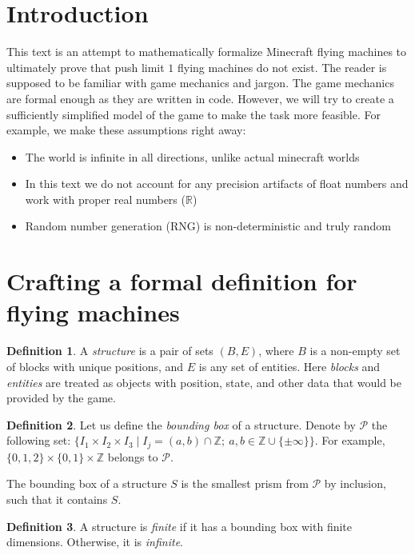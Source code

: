 \documentclass[12pt]{article}
\title{}
\author{}
\date{}
\newcommand{\R}{\mathbb{R}}
\newcommand{\Z}{\mathbb{Z}}
\theoremstyle{remark}
\theoremstyle{definition}
\newtheorem{definition}{Definition}
\begin{document}
\section{Introduction}

This text is an attempt to mathematically formalize Minecraft flying machines to ultimately prove that push limit $1$ flying machines do not exist.
The reader is supposed to be familiar with game mechanics and jargon. The game mechanics are formal enough as they are written in code.
However, we will try to create a sufficiently simplified model of the game to make the task more feasible.
For example, we make these assumptions right away:
\begin{itemize}
\item The world is infinite in all directions, unlike actual minecraft worlds
\item In this text we do not account for any precision artifacts of float numbers and work with proper real numbers ($\R$)
\item Random number generation (RNG) is non-deterministic and truly random
\end{itemize}

\section{Crafting a formal definition for flying machines}

\begin{definition}
    A \emph{structure} is a pair of sets $(B, E)$, where $B$ is a non-empty set of blocks with unique positions, and $E$ is any set of entities.
    Here \emph{blocks} and \emph{entities} are treated as objects with position, state, and other data that would be provided by the game.
\end{definition}

\begin{definition}
    Let us define the \emph{bounding box} of a structure. Denote by $\mathcal{P}$ the following set:
    $\bigl\{I_1\times I_2\times I_3 \mid I_j=(a,b)\cap\Z;\ a,b\in\Z\cup\{\pm\infty\}\bigr\}$. For example, $\{0,1,2\}\times\{0,1\}\times\Z$ belongs to $\mathcal{P}$.

    The bounding box of a structure $S$ is the smallest prism from $\mathcal{P}$ by inclusion, such that it contains $S$.
\end{definition}

\begin{definition}
    A structure is \emph{finite} if it has a bounding box with finite dimensions. Otherwise, it is \emph{infinite}.
\end{definition}
\end{document}
